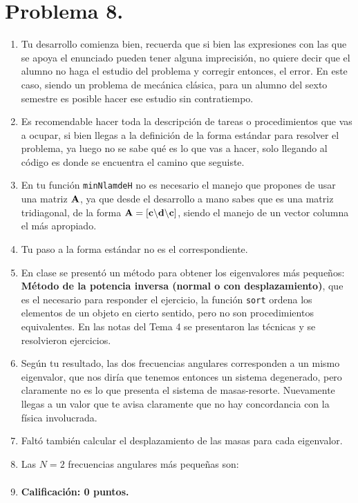 \section{Problema 8.}

\begin{enumerate}
\item Tu desarrollo comienza bien, recuerda que si bien las expresiones con las que se apoya el enunciado pueden tener alguna imprecisión, no quiere decir que el alumno no haga el estudio del problema y corregir entonces, el error. En este caso, siendo un problema de mecánica clásica, para un alumno del sexto semestre es posible hacer ese estudio sin contratiempo.
\item Es recomendable hacer toda la descripción de tareas o procedimientos que vas a ocupar, si bien llegas a la definición de la forma estándar para resolver el problema, ya luego no se sabe qué es lo que vas a hacer, solo llegando al código es donde se encuentra el camino que seguiste.
\item En tu función \texttt{minNlamdeH} no es necesario el manejo que propones de usar una matriz $\vb{A}$, ya que desde el desarrollo a mano sabes que es una matriz tridiagonal, de la forma $\vb{A} = [\vb{c} \backslash \vb{d} \backslash \vb{c}]$, siendo el manejo de un vector columna el más apropiado. 
\item Tu paso a la forma estándar no es el correspondiente.
\item En clase se presentó un método para obtener los eigenvalores más pequeños: \textbf{Método de la potencia inversa (normal o con desplazamiento)}, que es el necesario para responder el ejercicio, la función \texttt{sort} ordena los elementos de un objeto en cierto sentido, pero no son procedimientos equivalentes. En las notas del Tema 4 se presentaron las técnicas y se resolvieron ejercicios.
\item Según tu resultado, las dos frecuencias angulares corresponden a un mismo eigenvalor, que nos diría que tenemos entonces un sistema degenerado, pero claramente no es lo que presenta el sistema de masas-resorte. Nuevamente llegas a un valor que te avisa claramente que no hay concordancia con la física involucrada.
\item Faltó también calcular el desplazamiento de las masas para cada eigenvalor.
\item Las $N = 2$ frecuencias angulares más pequeñas son:
\begin{align*}
[74.268887 \quad 215.306539 ]
\end{align*}
\item \textbf{Calificación: 0 puntos.}
\end{enumerate}

